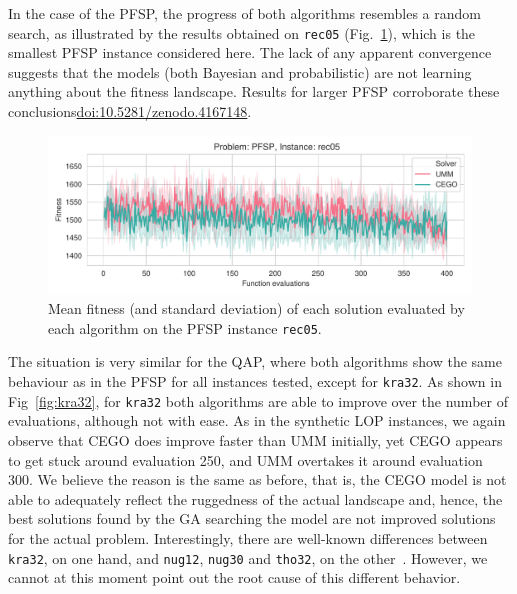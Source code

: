 \documentclass[runningheads]{llncs}
\newcommand{\supplement}{\href{http://doi.org/10.5281/zenodo.4167148}{doi:10.5281/zenodo.4167148}}
\begin{document}
In the case of the PFSP, the progress of both algorithms resembles a random search, as illustrated by the results
 obtained on \texttt{rec05} (Fig.~\ref{fig:rec05}), which is the smallest PFSP
instance considered here. The lack of any apparent convergence suggests that
the models (both Bayesian and probabilistic) are not learning anything about
the fitness landscape. Results for larger PFSP corroborate these conclusions\supplement.
  

\begin{figure}[tb]
  \centering%
  \includegraphics[width=\textwidth]{../img/fitness_real_pfsp_rec05_txt}
  \caption{Mean fitness  (and standard deviation)  of each solution evaluated by each algorithm on the PFSP instance \texttt{rec05}.\label{fig:rec05}}
\end{figure}

The situation is very similar for the QAP, where both algorithms show the same
behaviour as in the PFSP for all instances tested, except for
\texttt{kra32}. As shown in Fig~\ref{fig:kra32}, for \texttt{kra32} both
algorithms are able to improve over the number of evaluations, although not
with ease. As in the synthetic LOP instances, we again observe that CEGO does
improve faster than UMM initially, yet CEGO appears to get stuck around
evaluation 250, and UMM overtakes it around evaluation 300. We believe the
reason is the same as before, that is, the CEGO model is not able to adequately
reflect the ruggedness of the actual landscape and, hence, the best solutions
found by the GA searching the model are not improved solutions for the actual
problem. Interestingly, there are well-known differences between
\texttt{kra32}, on one hand, and \texttt{nug12}, \texttt{nug30} and
\texttt{tho32}, on the other~\citep{AnsBriGou2002qap}. However, we cannot at
this moment point out the root cause of this different behavior.
\end{document}
